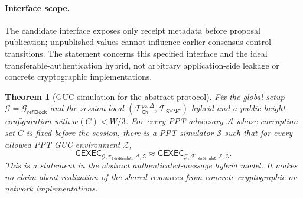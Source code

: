 \documentclass[conference,letterpaper,10pt]{IEEEtran}
\newtheorem{theorem}{Theorem}
\begin{document}
\paragraph{Interface scope.}
The candidate interface exposes only receipt metadata before proposal publication; unpublished values cannot influence earlier consensus control transitions. The statement concerns this specified interface and the ideal transferable-authentication hybrid, not arbitrary application-side leakage or concrete cryptographic implementations.

\begin{theorem}[GUC simulation for the abstract protocol]\label{thm:tendermint-mapping}
Fix the global setup $\mathcal{G}=\mathcal{G}_{\scriptscriptstyle\mathsf{refClock}}$ and the session-local $(\mathcal{F}_{\scriptscriptstyle\mathsf{Ch}}^{\mathsf{ps},\Delta},\mathcal{F}_{\scriptscriptstyle\mathsf{SYNC}})$ hybrid and a public height configuration with $w(C)<W/3$. For every PPT adversary $\mathcal{A}$ whose corruption set $C$ is fixed before the session, there is a PPT simulator $\mathcal{S}$ such that for every allowed PPT GUC environment $\mathcal{Z}$,
\[
\mathsf{GEXEC}_{\mathcal{G},\pi_{\scriptscriptstyle\mathsf{Tendermint}},\mathcal{A},\mathcal{Z}}
\approx
\mathsf{GEXEC}_{\mathcal{G},\mathcal{F}_{\scriptscriptstyle\mathsf{Tendermint}},\mathcal{S},\mathcal{Z}}.
\]
This is a statement in the abstract authenticated-message hybrid model. It makes no claim about realization of the shared resources from concrete cryptographic or network implementations.
\end{theorem}
\end{document}
